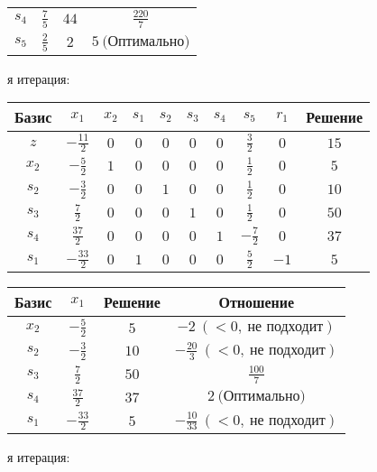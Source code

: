 \documentclass{article}%
\begin{document}
\begin{flushleft}
\begin{tabular}{|cccc|}
$s_{4}$&$\frac{7}{5}$&$44$&$\frac{220}{7}$\\%
$s_{5}$&$\frac{2}{5}$&$2$&$5\: \text{(Оптимально)}$\\%
\hline%
\end{tabular}%
\newline%
\newline%
я итерация: %
\newline%
\newline%
\renewcommand{\arraystretch}{1.3}%
\begin{tabular}{|c|cccccccc|c|}%
\hline%
Базис&$x_{1}$&$x_{2}$&$s_{1}$&$s_{2}$&$s_{3}$&$s_{4}$&$s_{5}$&$r_{1}$&Решение\\%
\hline%
$z$&$-\frac{11}{2}$&$0$&$0$&$0$&$0$&$0$&$\frac{3}{2}$&$0$&$15$\\%
\hline%
$x_{2}$&$-\frac{5}{2}$&$1$&$0$&$0$&$0$&$0$&$\frac{1}{2}$&$0$&$5$\\%
$s_{2}$&$-\frac{3}{2}$&$0$&$0$&$1$&$0$&$0$&$\frac{1}{2}$&$0$&$10$\\%
$s_{3}$&$\frac{7}{2}$&$0$&$0$&$0$&$1$&$0$&$\frac{1}{2}$&$0$&$50$\\%
$s_{4}$&$\frac{37}{2}$&$0$&$0$&$0$&$0$&$1$&$-\frac{7}{2}$&$0$&$37$\\%
$s_{1}$&$-\frac{33}{2}$&$0$&$1$&$0$&$0$&$0$&$\frac{5}{2}$&$-1$&$5$\\%
\hline%
\end{tabular}%
\newline%
\newline%
\newline%
\begin{tabular}{|cccc|}%
\hline%
Базис&$x_{1}$&Решение&Отношение\\%
\hline%
$x_{2}$&$-\frac{5}{2}$&$5$&$-2\: (< 0, \: \text{не подходит})$\\%
$s_{2}$&$-\frac{3}{2}$&$10$&$-\frac{20}{3}\: (< 0, \: \text{не подходит})$\\%
$s_{3}$&$\frac{7}{2}$&$50$&$\frac{100}{7}$\\%
$s_{4}$&$\frac{37}{2}$&$37$&$2\: \text{(Оптимально)}$\\%
$s_{1}$&$-\frac{33}{2}$&$5$&$-\frac{10}{33}\: (< 0, \: \text{не подходит})$\\%
\hline%
\end{tabular}%
\newline%
\newline%
я итерация: %
\newline%
\newline%

\end{flushleft}
\end{document}

